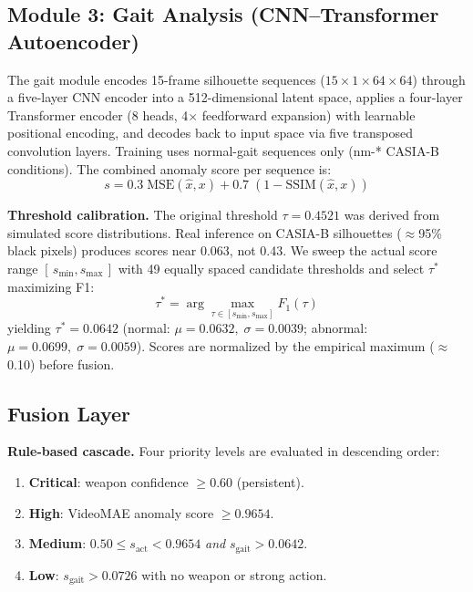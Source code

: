 \documentclass[conference]{IEEEtran}
\begin{document}
\subsection{Module 3: Gait Analysis (CNN--Transformer Autoencoder)}

The gait module encodes 15-frame silhouette sequences
($15\!\times\!1\!\times\!64\!\times\!64$) through a five-layer CNN encoder
into a 512-dimensional latent space, applies a four-layer Transformer encoder
(8 heads, 4$\times$ feedforward expansion) with learnable positional encoding,
and decodes back to input space via five transposed convolution layers.
Training uses normal-gait sequences only (nm-* CASIA-B conditions).
The combined anomaly score per sequence is:
\begin{equation}
  s = 0.3\;\text{MSE}(\hat{x}, x) + 0.7\;(1 - \text{SSIM}(\hat{x}, x))
  \label{eq:score}
\end{equation}

\noindent\textbf{Threshold calibration.}
The original threshold $\tau=0.4521$ was derived from simulated score
distributions.
Real inference on CASIA-B silhouettes ($\approx$95\% black pixels) produces
scores near 0.063, not 0.43.
We sweep the actual score range $[\,s_{\min}, s_{\max}\,]$ with 49 equally
spaced candidate thresholds and select $\tau^*$ maximizing F1:
\begin{equation}
  \tau^* = \arg\max_{\tau \in [s_{\min}, s_{\max}]} F_1(\tau)
  \label{eq:thresh}
\end{equation}
yielding $\tau^*=0.0642$ (normal: $\mu=0.0632,\;\sigma=0.0039$;
abnormal: $\mu=0.0699,\;\sigma=0.0059$).
Scores are normalized by the empirical maximum ($\approx$0.10) before fusion.

\subsection{Fusion Layer}

\noindent\textbf{Rule-based cascade.}
Four priority levels are evaluated in descending order:
\begin{enumerate}
  \item \textbf{Critical}: weapon confidence $\geq0.60$ (persistent).
  \item \textbf{High}: VideoMAE anomaly score $\geq0.9654$.
  \item \textbf{Medium}: $0.50\leq s_\text{act}<0.9654$ \emph{and}
        $s_\text{gait}>0.0642$.
  \item \textbf{Low}: $s_\text{gait}>0.0726$ with no weapon or strong action.
\end{enumerate}
\end{document}
